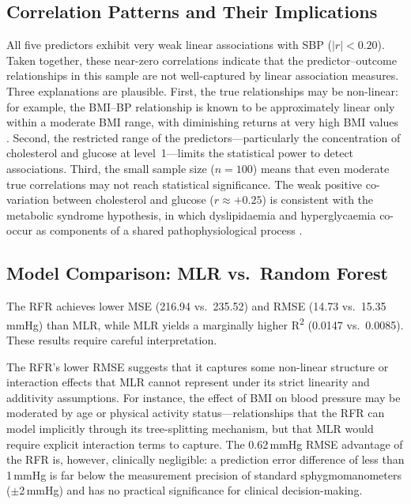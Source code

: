 ﻿\documentclass[conference]{IEEEtran}
\begin{document}
\subsection{Correlation Patterns and Their Implications}

All five predictors exhibit very weak linear associations with SBP ($|r| < 0.20$). Taken together, these near-zero correlations indicate that the predictor--outcome relationships in this sample are not well-captured by linear association measures. Three explanations are plausible. First, the true relationships may be non-linear: for example, the BMI--BP relationship is known to be approximately linear only within a moderate BMI range, with diminishing returns at very high BMI values \cite{linderman2018}. Second, the restricted range of the predictors---particularly the concentration of cholesterol and glucose at level~1---limits the statistical power to detect associations. Third, the small sample size ($n=100$) means that even moderate true correlations may not reach statistical significance. The weak positive co-variation between cholesterol and glucose ($r \approx +0.25$) is consistent with the metabolic syndrome hypothesis, in which dyslipidaemia and hyperglycaemia co-occur as components of a shared pathophysiological process \cite{nihms2014}.

\subsection{Model Comparison: MLR vs.\ Random Forest}

The RFR achieves lower MSE (216.94 vs.\ 235.52) and RMSE (14.73 vs.\ 15.35\,mmHg) than MLR, while MLR yields a marginally higher R\textsuperscript{2} (0.0147 vs.\ 0.0085). These results require careful interpretation.

The RFR's lower RMSE suggests that it captures some non-linear structure or interaction effects that MLR cannot represent under its strict linearity and additivity assumptions. For instance, the effect of BMI on blood pressure may be moderated by age or physical activity status---relationships that the RFR can model implicitly through its tree-splitting mechanism, but that MLR would require explicit interaction terms to capture. The 0.62\,mmHg RMSE advantage of the RFR is, however, clinically negligible: a prediction error difference of less than 1\,mmHg is far below the measurement precision of standard sphygmomanometers ($\pm$2\,mmHg) and has no practical significance for clinical decision-making.
\end{document}

